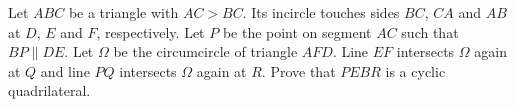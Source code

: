 Let $ABC$ be a triangle with $AC>BC$.
Its incircle touches sides $BC$, $CA$ and $AB$ at $D$, $E$ and $F$, respectively.
Let $P$ be the point on segment $AC$ such that $BP\parallel DE$.
Let $\Omega$ be the circumcircle of triangle $AFD$.
Line $EF$ intersects $\Omega$ again at $Q$ and line $PQ$ intersects $\Omega$ again at $R$.
Prove that $PEBR$ is a cyclic quadrilateral.

